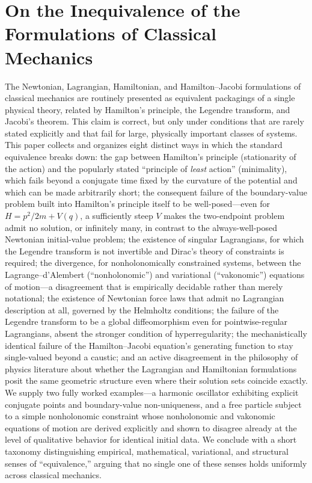 \section{On the Inequivalence of the Formulations of Classical Mechanics}

The Newtonian, Lagrangian, Hamiltonian, and Hamilton--Jacobi formulations of
classical mechanics are routinely presented as equivalent packagings of a
single physical theory, related by Hamilton's principle, the Legendre
transform, and Jacobi's theorem. This claim is correct, but only under
conditions that are rarely stated explicitly and that fail for large,
physically important classes of systems. This paper collects and organizes
eight distinct ways in which the standard equivalence breaks down: the gap
between Hamilton's principle (stationarity of the action) and the popularly
stated ``principle of \emph{least} action'' (minimality), which fails beyond a
conjugate time fixed by the curvature of the potential and which can be made
arbitrarily short; the consequent failure of the boundary-value problem built
into Hamilton's principle itself to be well-posed---even for $H=p^2/2m+V(q)$, a
sufficiently steep $V$ makes the two-endpoint problem admit no solution, or
infinitely many, in contrast to the always-well-posed Newtonian initial-value
problem; the existence of singular Lagrangians, for which the Legendre
transform is not invertible and Dirac's theory of constraints is required; the
divergence, for nonholonomically constrained systems, between the
Lagrange--d'Alembert (``nonholonomic'') and variational (``vakonomic'')
equations of motion---a disagreement that is empirically decidable rather than
merely notational; the existence of Newtonian force laws that admit no
Lagrangian description at all, governed by the Helmholtz conditions; the
failure of the Legendre transform to be a global diffeomorphism even for
pointwise-regular Lagrangians, absent the stronger condition of
hyperregularity; the mechanistically identical failure of the Hamilton--Jacobi
equation's generating function to stay single-valued beyond a caustic; and an
active disagreement in the philosophy of physics literature about whether the
Lagrangian and Hamiltonian formulations posit the same geometric structure even
where their solution sets coincide exactly. We supply two fully worked
examples---a harmonic oscillator exhibiting explicit conjugate points and
boundary-value non-uniqueness, and a free particle subject to a simple
nonholonomic constraint whose nonholonomic and vakonomic equations of motion
are derived explicitly and shown to disagree already at the level of
qualitative behavior for identical initial data. We conclude with a short
taxonomy distinguishing empirical, mathematical, variational, and structural
senses of ``equivalence,'' arguing that no single one of these senses holds
uniformly across classical mechanics.

